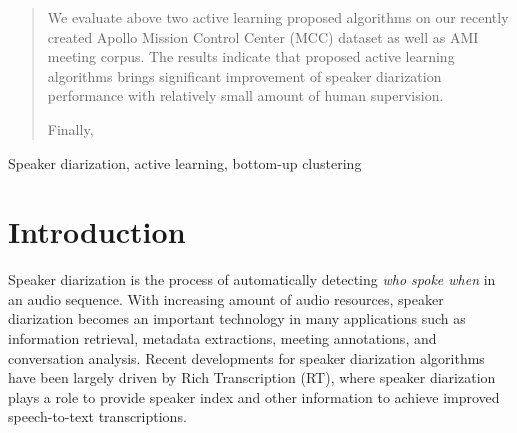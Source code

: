 \documentclass[journal]{IEEEtran}
\begin{document}
\begin{abstract}
We evaluate above two active learning proposed algorithms on our recently created Apollo Mission Control Center (MCC) dataset as well as AMI meeting corpus. The results indicate that proposed active learning algorithms brings significant improvement of speaker diarization performance with relatively small amount of human supervision.  

Finally, 
     
\end{abstract}

\begin{IEEEkeywords}
Speaker diarization, active learning, bottom-up clustering
\end{IEEEkeywords}

%
\IEEEpeerreviewmaketitle

\section{Introduction}
\label{intro}
Speaker diarization is the process of automatically detecting \textit{who spoke when }in an audio sequence. With increasing amount of audio resources, speaker diarization becomes an important technology in many applications such as information retrieval, metadata extractions, meeting annotations, and conversation analysis. Recent developments for speaker diarization algorithms have been largely driven by Rich Transcription (RT), where speaker diarization plays a role to provide speaker index and other information to achieve improved speech-to-text transcriptions.
\end{document}
